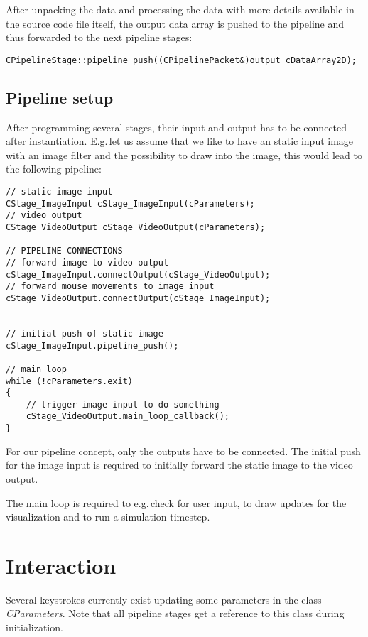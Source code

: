 \documentclass[11pt,a4paper]{article}
\begin{document}
\noindent
After unpacking the data and processing the data with more details available in
the source code file itself, the output data array is pushed to the pipeline and
thus forwarded to the next pipeline stages:
\begin{lstlisting}
CPipelineStage::pipeline_push((CPipelinePacket&)output_cDataArray2D);
\end{lstlisting}

%
\subsection{Pipeline setup}

After programming several stages, their input and output has to be
connected after instantiation.
E.g.\,let us assume that we like to have an static input image with an image
filter and the possibility to draw into the image, this would lead to the
following pipeline:

\begin{lstlisting}
// static image input
CStage_ImageInput cStage_ImageInput(cParameters);
// video output
CStage_VideoOutput cStage_VideoOutput(cParameters);

// PIPELINE CONNECTIONS
// forward image to video output
cStage_ImageInput.connectOutput(cStage_VideoOutput);
// forward mouse movements to image input
cStage_VideoOutput.connectOutput(cStage_ImageInput);


// initial push of static image
cStage_ImageInput.pipeline_push();

// main loop
while (!cParameters.exit)
{
	// trigger image input to do something
	cStage_VideoOutput.main_loop_callback();
}
\end{lstlisting}

\noindent
For our pipeline concept, only the outputs have to be connected.
The initial push for the image input is required to initially forward the static
image to the video output.

The main loop is required to e.g.\,check for user input, to draw updates for the
visualization and to run a simulation timestep.


\section{Interaction}

Several keystrokes currently exist updating some parameters in the class
\textit{CParameters}.
Note that all pipeline stages get a reference to this class during
initialization.
\end{document}
